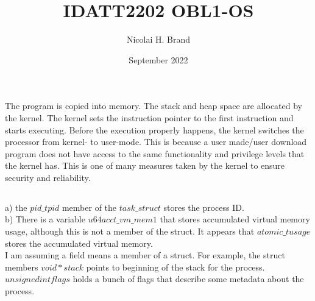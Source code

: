 \documentclass{article}
\title{IDATT2202 OBL1-OS}
\author{Nicolai H. Brand}
\date{September 2022}
\begin{document}
\maketitle

\section{}
\subsection{}
    The program is copied into memory. The stack and heap space are allocated by the kernel. The kernel sets the instruction pointer to the first instruction and starts executing. Before the execution properly happens, the kernel switches the processor from kernel- to user-mode. This is because a user made/user download program does not have access to the same functionality and privilege levels that the kernel has. This is one of many measures taken by the kernel to ensure security and reliability. 

\subsection{}
    a) the $pid\_t pid$ member of the $task\_struct$ stores the process ID.\\
    b) There is a variable $u64 acct\_vm\_mem1$ that stores accumulated virtual memory usage, although this is not a member of the struct. It appears that $atomic\_t usage$ stores the accumulated virtual memory.\\
    
    I am assuming a field means a member of a struct. For example, the struct members $void *stack$ points to beginning of the stack for the process. $unsigned int flags$ holds a bunch of flags that describe some metadata about the process. 

\section{}
\end{document}
